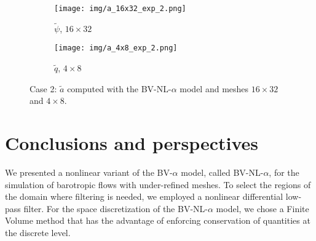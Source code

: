\documentclass[11pt,a4paper]{article}
\begin{document}
\begin{figure}[htb!]
\centering
\begin{subfigure}{0.193\textwidth}
         \centering
         \texttt{[image: img/a\_16x32\_exp\_2.png]}
         \caption{\scriptsize{$\widetilde{\psi}$, $16 \times 32$}}
     \end{subfigure}
     \begin{subfigure}{0.193\textwidth}
         \centering
         \texttt{[image: img/a\_4x8\_exp\_2.png]}
         \caption{\scriptsize{$\widetilde{q}$, $4 \times 8$}}
     \end{subfigure}
\caption{Case 2: $\widetilde{a}$ computed with the BV-NL-$\alpha$ model and meshes $16 \times 32$ and  $4 \times 8$. }
\label{fig:indicator_func_second}
\end{figure}




\section{Conclusions and perspectives}\label{sec:conclusions}

We presented a nonlinear variant of the BV-$\alpha$ model, called BV-NL-$\alpha$, for the simulation of  
barotropic flows with under-refined meshes. %
To select the regions of the domain where filtering is needed, we employed %
a nonlinear differential low-pass filter. For the space discretization of the BV-NL-$\alpha$ model, 
we chose a Finite Volume method that has the advantage of enforcing conservation of quantities at the discrete level.
\end{document}
